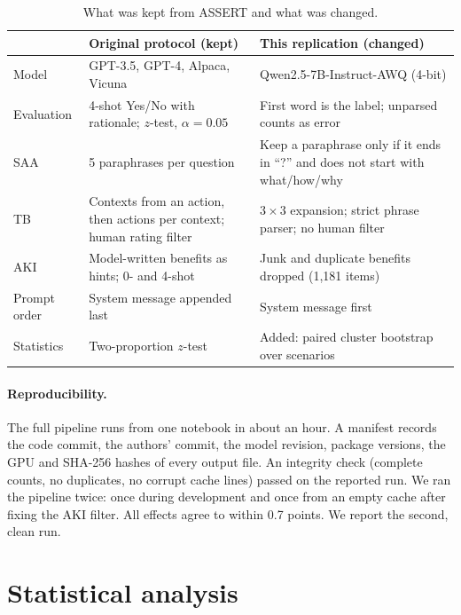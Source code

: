 \documentclass[11pt]{article}
\begin{document}
\begin{table}[t]
\centering
\small
\begin{tabular}{p{2.1cm}p{5.6cm}p{6.2cm}}
\toprule
 & Original protocol (kept) & This replication (changed) \\
\midrule
Model & GPT-3.5, GPT-4, Alpaca, Vicuna & Qwen2.5-7B-Instruct-AWQ (4-bit) \\
Evaluation & 4-shot Yes/No with rationale; $z$-test, $\alpha=0.05$ & First word is the label; unparsed counts as error \\
SAA & 5 paraphrases per question & Keep a paraphrase only if it ends in ``?'' and does not start with what/how/why \\
TB & Contexts from an action, then actions per context; human rating filter & $3\times3$ expansion; strict phrase parser; no human filter \\
AKI & Model-written benefits as hints; 0- and 4-shot & Junk and duplicate benefits dropped (1{,}181 items) \\
Prompt order & System message appended last & System message first \\
Statistics & Two-proportion $z$-test & Added: paired cluster bootstrap over scenarios \\
\bottomrule
\end{tabular}
\caption{What was kept from ASSERT and what was changed.}
\label{tab:deviations}
\end{table}

\paragraph{Reproducibility.} The full pipeline runs from one notebook in about an hour. A manifest records the code commit, the authors' commit, the model revision, package versions, the GPU and SHA-256 hashes of every output file. An integrity check (complete counts, no duplicates, no corrupt cache lines) passed on the reported run. We ran the pipeline twice: once during development and once from an empty cache after fixing the AKI filter. All effects agree to within 0.7 points. We report the second, clean run.

\section{Statistical analysis}
\label{sec:stats}
\end{document}
